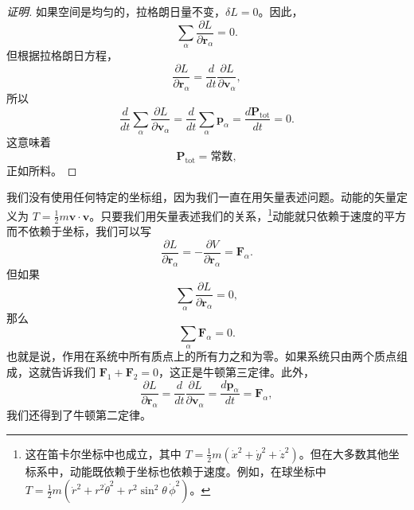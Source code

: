 \begin{proof}[证明]
如果空间是均匀的，拉格朗日量不变，$\delta L = 0$。因此，
\begin{equation}\label{eq:1.mom1}
\sum_{\alpha}\frac{\partial L}{\partial \mathbf{r}_\alpha} = 0.
\end{equation}
但根据拉格朗日方程，
\begin{equation*}
\frac{\partial L}{\partial \mathbf{r}_\alpha} = \frac{d}{dt}\frac{\partial L}{\partial \mathbf{v}_\alpha},
\end{equation*}
所以
\begin{equation}\label{eq:1.mom2}
\frac{d}{dt}\sum_{\alpha}\frac{\partial L}{\partial \mathbf{v}_\alpha} = \frac{d}{dt}\sum_{\alpha}\mathbf{p}_\alpha = \frac{d\mathbf{P}_{\mathrm{tot}}}{dt} = 0.
\end{equation}
这意味着
\begin{equation}\label{eq:1.mom3}
\mathbf{P}_{\mathrm{tot}} = \text{常数},
\end{equation}
正如所料。
\end{proof}

我们没有使用任何特定的坐标组，因为我们一直在用矢量表述问题。动能的矢量定义为 $T = \frac{1}{2}m\mathbf{v}\cdot\mathbf{v}$。只要我们用矢量表述我们的关系，\footnote{这在笛卡尔坐标中也成立，其中 $T = \frac{1}{2}m\left(\dot{x}^2 + \dot{y}^2 + \dot{z}^2\right)$。但在大多数其他坐标系中，动能既依赖于坐标也依赖于速度。例如，在球坐标中 $T = \frac{1}{2}m(\dot{r}^2 + r^2\dot{\theta}^2 + r^2\sin^2\theta\,\dot{\phi}^2)$。}动能就只依赖于速度的平方而不依赖于坐标，我们可以写
\begin{equation}\label{eq:1.Fa}
\frac{\partial L}{\partial \mathbf{r}_\alpha} = -\frac{\partial V}{\partial \mathbf{r}_\alpha} = \mathbf{F}_\alpha.
\end{equation}
但如果
\begin{equation*}
\sum_{\alpha}\frac{\partial L}{\partial \mathbf{r}_\alpha} = 0,
\end{equation*}
那么
\begin{equation}\label{eq:1.Fsum}
\sum_{\alpha}\mathbf{F}_\alpha = 0.
\end{equation}
也就是说，作用在系统中所有质点上的所有力之和为零。如果系统只由两个质点组成，这就告诉我们 $\mathbf{F}_1 + \mathbf{F}_2 = 0$，这正是牛顿第三定律。此外，
\begin{equation}\label{eq:1.Fa2}
\frac{\partial L}{\partial \mathbf{r}_\alpha} = \frac{d}{dt}\frac{\partial L}{\partial \mathbf{v}_\alpha} = \frac{d\mathbf{p}_\alpha}{dt} = \mathbf{F}_\alpha,
\end{equation}
我们还得到了牛顿第二定律。

